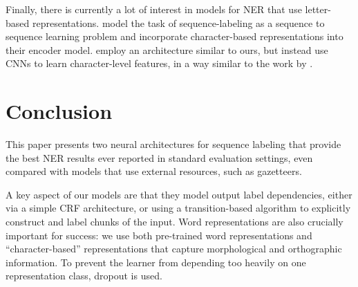 \documentclass[11pt,letterpaper]{article}
\newcommand{\ignore}[1]{}
\newcommand{\miguelcomment}[1]{\ignore{\textcolor{red}{\textbf{[#1 --\textsc{MB}]}}}}
\begin{document}
\ignore{\newcite{hammerton2003named} present recurrent neural architectures for NER without learning character-level representations.}

Finally, there is currently a lot of interest in models for NER that use letter-based representations.  model the task of sequence-labeling as a sequence to sequence learning problem and incorporate character-based representations into their encoder model.  employ an architecture similar to ours, but instead use CNNs to learn character-level features, in a way similar to the work by . %



\section{Conclusion}
This paper presents two neural architectures for sequence labeling that provide the best NER results ever reported in standard evaluation settings, even compared with models that use external resources, such as gazetteers.

A key aspect of our models are that they model output label dependencies, either via a simple CRF architecture, or using a transition-based algorithm to explicitly construct and label chunks of the input. Word representations are also crucially important for success: we use both pre-trained word representations and ``character-based'' representations that capture morphological and orthographic information. To prevent the learner from depending too heavily on one representation class, dropout is used.


\end{document}
